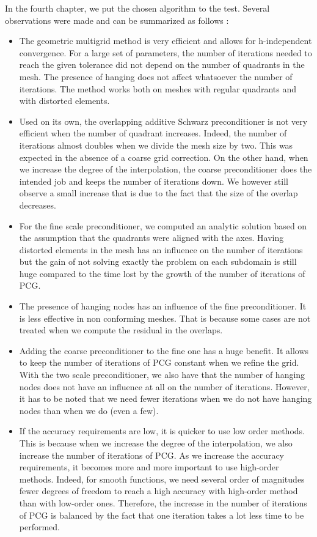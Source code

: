 In the fourth chapter, we put the chosen algorithm to the test. Several observations were made and can be summarized as follows : 

\begin{itemize}
\item The geometric multigrid method is very efficient and allows for h-independent convergence. For a large set of parameters, the number of iterations needed to reach the given tolerance did not depend on the number of quadrants in the mesh. The presence of hanging does not affect whatsoever the number of iterations. The method works both on meshes with regular quadrants and with distorted elements. 
\item Used on its own, the overlapping additive Schwarz preconditioner is not very efficient when the number of quadrant increases. Indeed, the number of iterations almost doubles when we divide the mesh size by two. This was expected in the absence of a coarse grid correction. On the other hand, when we increase the degree of the interpolation, the coarse preconditioner does the intended job and keeps the number of iterations down. We however still observe a small increase that is due to the fact that the size of the overlap decreases.
\item For the fine scale preconditioner, we computed an analytic solution based on the assumption that the quadrants were aligned with the axes. Having distorted elements in the mesh has an influence on the number of iterations but the gain of not solving exactly the problem on each subdomain is still huge compared to the time lost by the growth of the number of iterations of PCG.
\item The presence of hanging nodes has an influence of the fine preconditioner. It is less effective in non conforming meshes. That is because some cases are not treated when we compute the residual in the overlaps. 
\item Adding the coarse preconditioner to the fine one has a huge benefit. It allows to keep the number of iterations of PCG constant when we refine the grid. With the two scale preconditioner, we also have that the number of hanging nodes does not have an influence at all on the number of iterations. However, it has to be noted that we need fewer iterations when we do not have hanging nodes than when we do (even a few). 
\item If the accuracy requirements are low, it is quicker to use low order methods. This is because when we increase the degree of the interpolation, we also increase the number of iterations of PCG. As we increase the accuracy requirements, it becomes more and more important to use high-order methods. Indeed, for smooth functions, we need several order of magnitudes fewer degrees of freedom to reach a high accuracy with high-order method than with low-order ones. Therefore, the increase in the number of iterations of PCG is balanced by the fact that one iteration takes a lot less time to be performed. 
\end{itemize}

